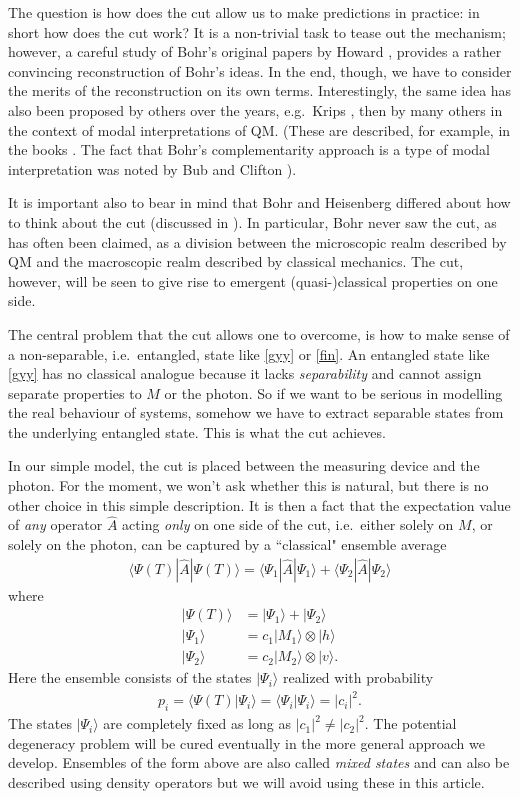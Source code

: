 \documentclass[12pt]{article}
\theoremstyle{plain}
\theoremstyle{definition}
\theoremstyle{remark}
\def\bra#1{\langle #1|}
\def\ket#1{| #1\rangle}
\newcommand{\EQ}[1]{\begin{equation}\begin{split} #1
\end{split}\end{equation}}
\begin{document}
The question is how does the cut allow us to make predictions in practice: in short how does the cut work? It is a non-trivial task to tease out the mechanism; however, a careful study of Bohr's original papers by Howard \cite{Howard2}, provides a rather convincing reconstruction of Bohr's ideas. In the end, though, we have to consider the merits of the reconstruction on its own terms. Interestingly, the same idea has also been proposed by others over the years, e.g.~Krips \cite{Krips:1969tpqm}, 
then by many others in the context of modal interpretations of QM. (These are described, for example, in the books \cite{vanFraassen:1991qmmv,Vermaas:1999puqm}. The fact that Bohr's complementarity approach is a type of modal interpretation was noted by Bub and Clifton \cite{BC}). 

It is important also to bear in mind that Bohr and Heisenberg differed about how to think about the cut (discussed in \cite{SC1,SC2}). In particular, Bohr never saw the cut, as has often been claimed, as a division between the microscopic realm described by QM and the macroscopic realm described by classical mechanics. The cut, however, will be seen to give rise to emergent (quasi-)classical properties on one side.

The central problem that the cut allows one to overcome, is how to make sense of a non-separable, i.e.~entangled, state like \eqref{gyy} or \eqref{fin}.  An entangled state like \eqref{gyy} has no classical analogue because it lacks {\it separability\/} and cannot assign separate properties to $M$ or the photon. So if we want to be serious in modelling the real behaviour of systems, somehow we have to extract separable states from the underlying entangled state. This is what the cut achieves.

In our simple model, the cut is placed between the measuring device and the photon. For the moment, we won't ask whether this is natural, but there is no other choice in this simple description.
It is then a fact that the expectation value of {\it any\/} operator $\hat A$ acting {\it only\/} on one side of the cut, i.e.~either solely on $M$, or solely on the photon, can be captured by a ``classical" ensemble average
\EQ{
\bra{\Psi(T)}\hat A\ket{\Psi(T)}=\bra{\Psi_1}\hat A\ket{\Psi_1}+\bra{\Psi_2}\hat A\ket{\Psi_2}
\label{kds}}
where
\begin{align*}
\ket{\Psi(T)}&=\ket{\Psi_1}+\ket{\Psi_2}\\
\ket{\Psi_1}&=c_1\ket{M_1}\otimes\ket{h}\\
\ket{\Psi_2}&=c_2\ket{M_2}\otimes\ket{v} .
\end{align*}
Here the ensemble consists of the states $\ket{\Psi_i}$  realized with probability
\EQ{
p_i=\bra{\Psi(T)}\Psi_i\rangle=\bra{\Psi_i}\Psi_i\rangle=|c_i|^2.
}
The states $\ket{\Psi_i}$ are completely fixed as long as $|c_1|^2\neq|c_2|^2$. The potential degeneracy problem will
be cured eventually in the more general approach we develop.
Ensembles of the form above are also called {\it mixed states\/} and can also be described using density operators but we will avoid using these in this article.
\end{document}
